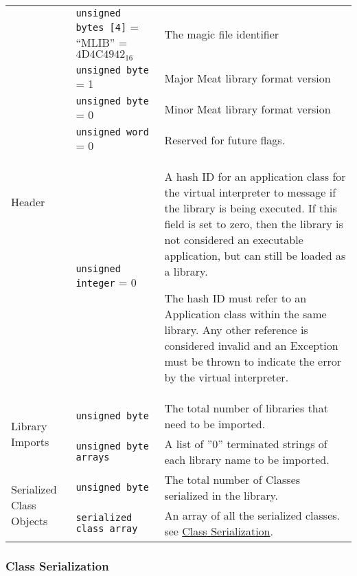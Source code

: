 \begin{center}
  \begin{tabular}{ |l|p{4.5cm}|p{7.5cm}| }
    \hline
    \multirow{5}{*}{Header} & \texttt{unsigned bytes [4]} = ``MLIB''
    = $\mathrm{4D4C4942}_{16}$ & The
    magic file identifier\\ \cline{2-3}
    & \texttt{unsigned byte} = 1 & Major Meat library format version\\
    \cline{2-3}
    & \texttt{unsigned byte} = 0 & Minor Meat library format version\\
    \cline{2-3}
    & \texttt{unsigned word} = 0 & Reserved for future flags.\\ \cline{2-3}
    & \texttt{unsigned integer} = 0 & A hash ID for an application class for
    the virtual interpreter to message if the library is being executed.
    If this field is set to zero, then the library is not considered an
    executable application, but can still be loaded as a library.

    The hash ID must refer to an Application class within the same library.
    Any other reference is considered invalid and an Exception must be
    thrown to indicate the error by the virtual interpreter.\\
    \hline

    \multirow{2}{*}{Library Imports} & \texttt{unsigned byte} & The total number of libraries that need to be imported.\\ \cline{2-3}
    & \texttt{unsigned byte arrays} & A list of ''0'' terminated strings of each library name to be imported.\\ \hline

    \multirow{2}{*}{Serialized Class Objects} & \texttt{unsigned byte} & The total number of Classes serialized in the library.\\ \cline{2-3}
    & \texttt{serialized class array} & An array of all the serialized classes. see \hyperref[sec:class_serial]{Class Serialization}.\\ \hline
  \end{tabular}
\end{center}

\subsubsection{Class Serialization}
\label{sec:class_serial}

